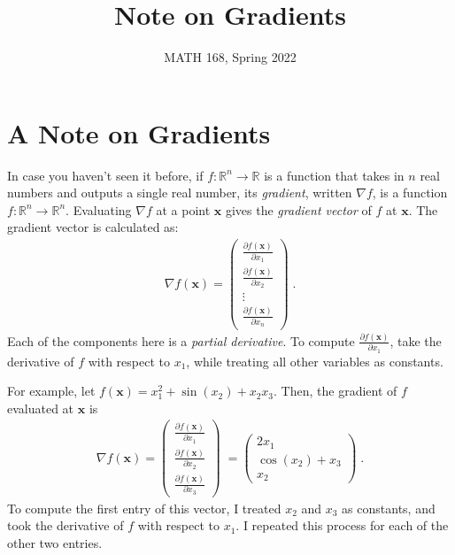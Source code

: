 \documentclass{hw}
\title{Note on Gradients}
\author{MATH 168, Spring 2022}
\date{}
\begin{document}
\section*{A Note on Gradients}

In case you haven't seen it before, if $f:\mathbb{R}^n \rightarrow \mathbb{R}$ is a function that takes in $n$ real numbers and outputs a single real number, its \emph{gradient}, written $\nabla f$, is a function $f:\mathbb{R}^n \rightarrow \mathbb{R}^n$. 
Evaluating $\nabla f$ at a point $\mathbf{x}$ gives the \emph{gradient vector} of $f$ at $\mathbf{x}$. 
The gradient vector is calculated as: 
\begin{align*}
    \nabla f(\mathbf{x}) = \left(\begin{matrix}
        \frac{\partial f(\mathbf{x})}{\partial x_1} \\ 
        \frac{\partial f(\mathbf{x})}{\partial x_2} \\ 
        \vdots  \\ 
        \frac{\partial f(\mathbf{x})}{\partial x_n}
    \end{matrix}\right)\;. 
\end{align*}
Each of the components here is a \emph{partial derivative}. 
To compute $\frac{\partial f(\mathbf{x})}{\partial x_1}$, take the derivative of $f$ with respect to $x_1$, while treating all other variables as constants. 

For example, let $f(\mathbf{x}) = x_1^2 + \sin(x_2) + x_2x_3$. 
Then, the gradient of $f$ evaluated at $\mathbf{x}$ is 
\begin{align*}
    \nabla f(\mathbf{x}) = \left(\begin{matrix}
        \frac{\partial f(\mathbf{x})}{\partial x_1} \\ 
        \frac{\partial f(\mathbf{x})}{\partial x_2} \\ 
        \frac{\partial f(\mathbf{x})}{\partial x_3}
    \end{matrix}\right)\; = \left(\begin{matrix}
        2x_1 \\ 
        \cos(x_2) + x_3 \\ 
        x_2\ 
    \end{matrix}\right)\;.
\end{align*}
To compute the first entry of this vector, I treated $x_2$ and $x_3$ as constants, and took the derivative of $f$ with respect to $x_1$. 
I repeated this process for each of the other two entries. 
\end{document}

